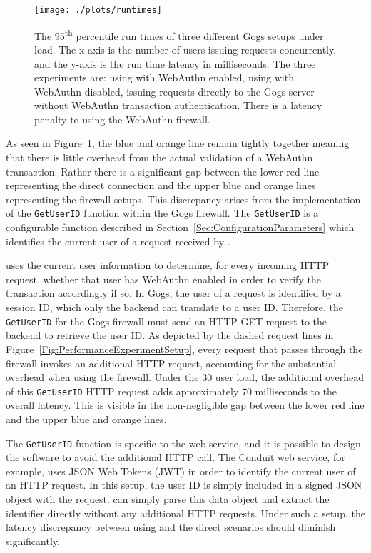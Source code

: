 \begin{figure}[h]
  \centering
  \texttt{[image: ./plots/runtimes]}
  \caption{The 95\textsuperscript{th} percentile run times of three different Gogs setups under load. The x-axis is the number of users issuing requests concurrently, and the y-axis is the run time latency in milliseconds. The three experiments are: using \sys{} with WebAuthn enabled, using \sys{} with WebAuthn disabled, issuing requests directly to the Gogs server without WebAuthn transaction authentication. There is a latency penalty to using the WebAuthn firewall.}
  \label{Fig:PerformanceOverhead}
\end{figure}

As seen in Figure~\ref{Fig:PerformanceOverhead}, the blue and orange line remain tightly together meaning that there is little overhead from the actual validation of a WebAuthn transaction. Rather there is a significant gap between the lower red line representing the direct connection and the upper blue and orange lines representing the firewall setups. This discrepancy arises from the implementation of the \lstinline{GetUserID} function within the Gogs firewall. The \lstinline{GetUserID} is a configurable function described in Section~\ref{Sec:ConfigurationParameters} which identifies the current user of a request received by \sys{}. 

\sys{} uses the current user information to determine, for every incoming HTTP request, whether that user has WebAuthn enabled in order to verify the transaction accordingly if so. In Gogs, the user of a request is identified by a session ID, which only the backend can translate to a user ID. Therefore, the \lstinline{GetUserID} for the Gogs firewall must send an HTTP GET request to the backend to retrieve the user ID. As depicted by the dashed request lines in Figure~\ref{Fig:PerformanceExperimentSetup}, every request that passes through the firewall invokes an additional HTTP request, accounting for the substantial overhead when using the firewall. Under the 30 user load, the additional overhead of this \lstinline{GetUserID} HTTP request adds approximately 70 milliseconds to the overall latency. This is visible in the non-negligible gap between the lower red line and the upper blue and orange lines.

The \lstinline{GetUserID} function is specific to the web service, and it is possible to design the software to avoid the additional HTTP call. The Conduit web service, for example, uses JSON Web Tokens (JWT) in order to identify the current user of an HTTP request. In this setup, the user ID is simply included in a signed JSON object with the request. \sys{} can simply parse this data object and extract the identifier directly without any additional HTTP requests. Under such a setup, the latency discrepancy between using \sys{} and the direct scenarios should diminish significantly.




